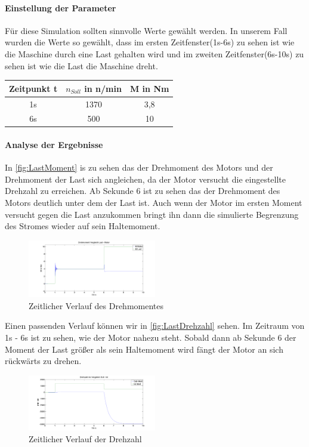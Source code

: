 \paragraph{Einstellung der Parameter}
	Für diese Simulation sollten sinnvolle Werte gewählt werden. In unserem Fall wurden die Werte so gewählt, dass im ersten Zeitfenster(1s-6s) zu sehen ist wie die Maschine durch eine Last gehalten wird und im zweiten Zeitfenster(6s-10s) zu sehen ist wie die Last die Maschine dreht.\\\par
	\begin{center}
		\begin{tabular}{c|c|c}
			Zeitpunkt t & $n_{Soll}$ in n/min & M in Nm\\ \hline
			1s & 1370 & 3,8\\
			6s & 500 & 10\\
		\end{tabular}
	\end{center}
\paragraph{Analyse der Ergebnisse}
	In \autoref{fig:LastMoment} is zu sehen das der Drehmoment des Motors und der Drehmoment der Last sich angleichen, da der Motor versucht die eingestellte Drehzahl zu erreichen. Ab Sekunde 6 ist zu sehen das der Drehmoment des Motors deutlich unter dem der Last ist. 
	Auch wenn der Motor im ersten Moment versucht gegen die Last anzukommen bringt ihn dann die simulierte Begrenzung des Stromes wieder auf sein Haltemoment.
	\begin{figure}[H]
		\includegraphics[width=0.5\textwidth]{pictures/LastMoment.png}
		\caption{Zeitlicher Verlauf des Drehmomentes}
		\label{fig:LastMoment}
	\end{figure}
	Einen passenden Verlauf können wir in \autoref{fig:LastDrehzahl} sehen. Im Zeitraum von 1s - 6s ist zu sehen, wie der Motor nahezu steht. Sobald dann ab Sekunde 6 der Moment der Last größer als sein Haltemoment wird fängt der Motor an sich rückwärts zu drehen.
	\begin{figure}[H]
		\includegraphics[width=0.5\textwidth]{pictures/LastDrehzahl.png}
		\caption{Zeitlicher Verlauf der Drehzahl}
		\label{fig:LastDrehzahl}
	\end{figure}
